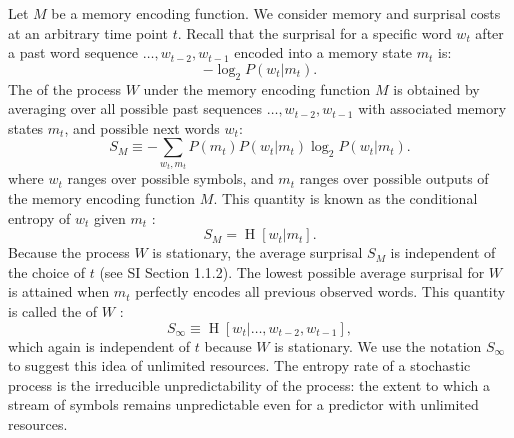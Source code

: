 Let $M$ be a memory encoding function.
We consider memory and surprisal costs at an arbitrary time point $t$.
Recall that the surprisal for a specific word $w_t$ after a past word sequence $\dots, w_{t-2}, w_{t-1}$ encoded into a memory state $m_t$ is:
\begin{equation*}
    -\log_2 P(w_t | m_t).
\end{equation*}
The  of the process $W$ under the memory encoding function $M$ is obtained by averaging over all possible past sequences $\dots, w_{t-2}, w_{t-1}$ with associated memory states $m_t$, and possible next words $w_t$:
\begin{equation*}
   S_M \equiv -\sum_{w_t,m_t}  P(m_t) P(w_t|m_t) \log_2 P(w_t | m_t).
\end{equation*}
where $w_t$ ranges over possible symbols, and $m_t$ ranges over possible outputs of the memory encoding function $M$.
This quantity is known as the conditional entropy of $w_t$ given $m_t$ \citep[][p. 17]{cover2006elements}:
\begin{equation*}
	S_M = \operatorname{H}[w_t | m_t].
\end{equation*}
Because the process $W$ is stationary, the average surprisal $S_M$ is independent of the choice of $t$ (see SI Section 1.1.2).
The lowest possible average surprisal for $W$ is attained when $m_t$ perfectly encodes all previous observed words.
This quantity is called the  of $W$ \citep[][pp. 74--75]{cover2006elements}:
\begin{equation*}
	S_\infty \equiv \operatorname{H}[w_t | \dots, w_{t-2}, w_{t-1}],
\end{equation*}
which again is independent of $t$ because $W$ is stationary.
We use the notation $S_\infty$ to suggest this idea of unlimited resources.
 The entropy rate of a stochastic process is the irreducible unpredictability of the process: the extent to which a stream of symbols remains unpredictable even for a predictor with unlimited resources. 


